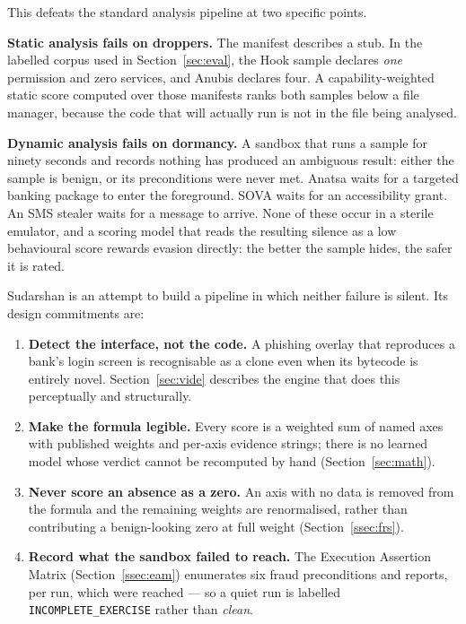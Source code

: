 \documentclass{article}
\begin{document}
This defeats the standard analysis pipeline at two specific points.

\textbf{Static analysis fails on droppers.} The manifest describes a stub. In
the labelled corpus used in Section~\ref{sec:eval}, the Hook sample declares
\emph{one} permission and zero services, and Anubis declares four. A
capability-weighted static score computed over those manifests ranks both
samples below a file manager, because the code that will actually run is not in
the file being analysed.

\textbf{Dynamic analysis fails on dormancy.} A sandbox that runs a sample for
ninety seconds and records nothing has produced an ambiguous result: either the
sample is benign, or its preconditions were never met. Anatsa waits for a
targeted banking package to enter the foreground. SOVA waits for an
accessibility grant. An SMS stealer waits for a message to arrive. None of these
occur in a sterile emulator, and a scoring model that reads the resulting
silence as a low behavioural score rewards evasion directly: the better the
sample hides, the safer it is rated.

Sudarshan is an attempt to build a pipeline in which neither failure is silent.
Its design commitments are:

\begin{enumerate}
\item \textbf{Detect the interface, not the code.} A phishing overlay that
reproduces a bank's login screen is recognisable as a clone even when its
bytecode is entirely novel. Section~\ref{sec:vide} describes the engine that
does this perceptually and structurally.
\item \textbf{Make the formula legible.} Every score is a weighted sum of named
axes with published weights and per-axis evidence strings; there is no learned
model whose verdict cannot be recomputed by hand (Section~\ref{sec:math}).
\item \textbf{Never score an absence as a zero.} An axis with no data is
removed from the formula and the remaining weights are renormalised, rather
than contributing a benign-looking zero at full weight
(Section~\ref{ssec:frs}).
\item \textbf{Record what the sandbox failed to reach.} The Execution Assertion
Matrix (Section~\ref{ssec:eam}) enumerates six fraud preconditions and reports,
per run, which were reached --- so a quiet run is labelled
\texttt{INCOMPLETE\_EXERCISE} rather than \emph{clean}.
\end{enumerate}
\end{document}
